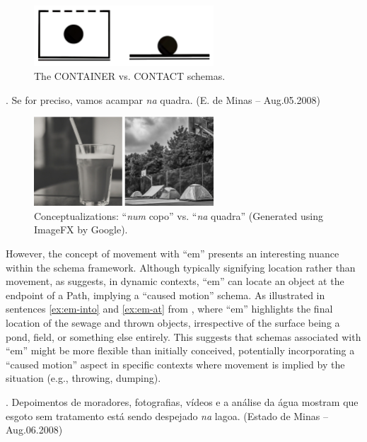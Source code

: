 {{\begin{figure}[ht]
\centering
\includegraphics[width=0.6\textwidth]{textual/Figuras/Untitled design.png}
\caption{The CONTAINER vs. CONTACT schemas.}
\label{fig: container}
\end{figure}

\ex. Se for preciso, vamos acampar \emph{na} quadra. (E. de Minas -- Aug.05.2008)  \label{ex:contact}

\begin{figure}[ht]
\centering
\includegraphics[width=0.6\textwidth]{textual/Figuras/Untitled design-2.png}
\caption{Conceptualizations: ``\emph{num} copo'' vs. ``\emph{na} quadra'' (Generated using ImageFX by Google).}
\label{fig: contact}
\end{figure}


However, the concept of movement with ``em'' presents an interesting nuance within the schema framework. Although typically signifying location rather than movement, as \textcite{oliveira2012cognitive} suggests, in dynamic contexts, ``em'' can locate an object at the endpoint of a Path, implying a ``caused motion'' schema. As illustrated in sentences \ref{ex:em-into} and \ref{ex:em-at} from \textcite{oliveira2012cognitive},  where ``em'' highlights the final location of the sewage and thrown objects, irrespective of the surface being a pond, field, or something else entirely. This suggests that schemas associated with ``em'' might be more flexible than initially conceived,  potentially incorporating a ``caused motion'' aspect in specific contexts where movement is implied by the situation (e.g., throwing, dumping).

\ex. Depoimentos de moradores, fotografias, vídeos e a análise da água mostram que esgoto sem tratamento está sendo despejado \emph{na} lagoa. (Estado de Minas – Aug.06.2008) \label{ex:em-into} 

}}
